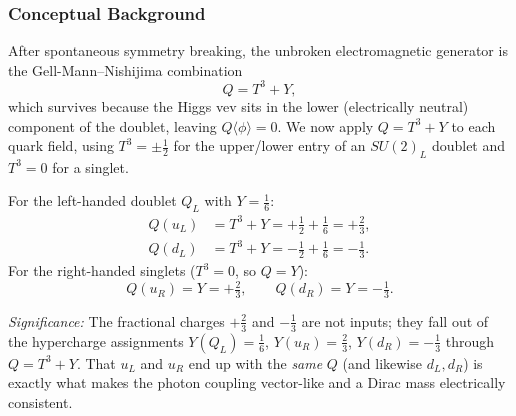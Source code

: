 \subsubsection*{Conceptual Background}

After spontaneous symmetry breaking, the unbroken electromagnetic
generator is the Gell-Mann--Nishijima combination
\begin{equation}
  Q = T^3 + Y,
  \label{eq:lec20:gmn}
\end{equation}
which survives because the Higgs vev sits in the lower (electrically
neutral) component of the doublet, leaving $Q\langle\phi\rangle=0$.
We now apply $Q=T^3+Y$ to each quark field, using $T^3=\pm\tfrac12$ for
the upper/lower entry of an $SU(2)_L$ doublet and $T^3=0$ for a singlet.

For the left-handed doublet $Q_L$ with $Y=\tfrac16$:
\begin{align}
  Q(u_L) &= T^3 + Y = +\tfrac12 + \tfrac16 = +\tfrac23,
  \label{eq:lec20:Qu}\\
  Q(d_L) &= T^3 + Y = -\tfrac12 + \tfrac16 = -\tfrac13.
  \label{eq:lec20:Qd}
\end{align}
For the right-handed singlets ($T^3=0$, so $Q=Y$):
\begin{equation}
  Q(u_R) = Y = +\tfrac23,
  \qquad
  Q(d_R) = Y = -\tfrac13.
  \label{eq:lec20:QuRdR}
\end{equation}


\textit{Significance:} The fractional charges $+\tfrac23$ and
$-\tfrac13$ are not inputs; they fall out of the hypercharge assignments
$Y(Q_L)=\tfrac16$, $Y(u_R)=\tfrac23$, $Y(d_R)=-\tfrac13$ through
$Q=T^3+Y$. That $u_L$ and $u_R$ end up with the \emph{same} $Q$ (and
likewise $d_L,d_R$) is exactly what makes the photon coupling
vector-like and a Dirac mass electrically consistent.


